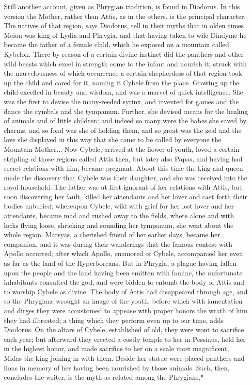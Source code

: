 \documentclass[a4paper, 11pt, oneside, polutonikogreek, english]{article}
\begin{document}
Still another account, given as Phrygian tradition, is found in Diodorus. In this version the Mother, rather than Attis, as in the others, is the principal character. The natives of that region, says Diodorus, tell in their myths that in olden times Meion was king of Lydia and Phrygia, and that having taken to wife Dindyme he became the father of a female child, which he exposed on a mountain called Kybelon. There by reason of a certain divine instinct did the panthers and other wild beasts which excel in strength come to the infant and nourish it; struck with the marvelousness of which occurrence a certain shepherdess of that region took up the child and cared for it, naming it Cybele from the place. Growing up the child excelled in beauty and wisdom, and was a marvel of quick intelligence. She was the first to devise the many-reeded syrinx, and invented for games and the dance the cymbals and the tympanum. Further, she devised means for the healing of animals and of little children; and indeed so many were the babes she saved by charms, and so fond was she of holding them, and so great was the zeal and the love she displayed in this way that she came to be called by everyone the Mountain Mother... Now Cybele, arrived at the flower of youth, loved a certain stripling of those regions called Attis then, but later also Papas, and having had secret relations with him, became pregnant. About this time the king and queen made the discovery that Cybele was their daughter, and she was received into the royal household. The father was at first ignorant of her relations with Attis, but soon discovering her fault, killed her attendants and her lover and cast forth their bodies unburied; whereupon Cybele, wild with grief for her lost lover and her attendants, became mad and rushed away to the fields, where alone and with locks flying loose, shrieking and sounding her tympanum, she went about the whole region. Marsyas, a cherished friend of her earlier days, became her companion, and it was during their wanderings that the famous contest with Apollo occurred; after which Apollo, enamored of Cybele, accompanied her even as far as the land of the Hyperboreans. But in Phrygia, a plague having fallen upon the people and the land having been smitten with famine, the unfortunate inhabitants consulted the god, and were bidden to entomb the body of Attis and to worship Cybele as divine. The body of Attis had disappeared through age, and so the Phrygians wrought an image of the youth, before which with lamentation and dirges they were accustomed to appease with proper honors the wrath of him they had illtreated; a thing which they perform even up to our time, adds Diodorus. On the altars of Cybele, established of old, they were wont to sacrifice each year; but afterward they erected a costly temple to her in Pessinus, held her in the highest honor, and made sacrifice to her on a scale most magnificent, Midas the king joining in with them. Beside her statue were placed panthers and lions in memory of her having been nourished by those animals. Such, then, concludes the writer, is the myth as related among the Phrygians.*
\end{document}
